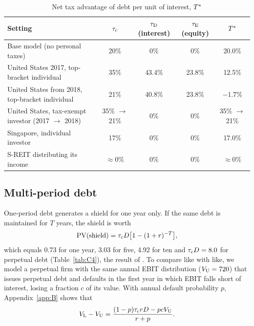 \begin{table}[htbp]\centering\footnotesize
\caption{Net tax advantage of debt per unit of interest, $\Tstar$}\label{tab:personal}
\begin{tabularx}{\linewidth}{@{}>{\raggedright\arraybackslash}p{6.6cm}CCCC@{}}
\toprule
Setting & $\tau_{\mathrm{c}}$ & $\tau_{\mathrm{D}}$ (interest) & $\tau_{\mathrm{E}}$ (equity) & $\Tstar$ \\
\midrule
Base model (no personal taxes) & 20\% & 0\% & 0\% & 20.0\% \\
United States 2017, top-bracket individual & 35\% & 43.4\% & 23.8\% & 12.5\% \\
United States from 2018, top-bracket individual & 21\% & 40.8\% & 23.8\% & $-1.7\%$ \\
United States, tax-exempt investor (2017 $\to$ 2018) & 35\% $\to$ 21\% & 0\% & 0\% & 35\% $\to$ 21\% \\
Singapore, individual investor & 17\% & 0\% & 0\% & 17.0\% \\
S-REIT distributing its income & $\approx 0\%$ & 0\% & 0\% & $\approx 0\%$ \\
\bottomrule
\end{tabularx}
\end{table}

\subsection{Multi-period debt}\label{sec:multi}

One-period debt generates a shield for one year only. If the same debt is maintained for $T$ years, the shield is worth
\begin{equation}
  \mathrm{PV}(\text{shield}) = \tau_{\mathrm{c}} D\bigl[1 - (1 + r)^{-T}\bigr],
  \label{eq:pvshield}
\end{equation}
which equals 0.73 for one year, 3.03 for five, 4.92 for ten and $\tau_{\mathrm{c}} D = 8.0$ for perpetual debt (Table~\ref{tab:C4}), the result of \citet{mm1963}. To compare like with like, we model a perpetual firm with the same annual EBIT distribution ($V_{\mathrm{U}} = 720$) that issues perpetual debt and defaults in the first year in which EBIT falls short of interest, losing a fraction $c$ of its value. With annual default probability $p$, Appendix~\ref{app:B} shows that
\begin{equation}
  V_{\mathrm{L}} - V_{\mathrm{U}} = \frac{(1 - p)\tau_{\mathrm{c}} r D - p c V_{\mathrm{U}}}{r + p}.
  \label{eq:perp}
\end{equation}

